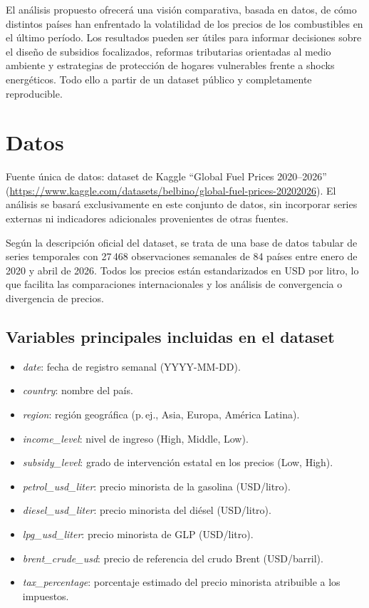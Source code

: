 \documentclass[stu, 12pt, a4paper, biblatex, donotrepeattitle]{apa7}
\begin{document}
El análisis propuesto ofrecerá una visión comparativa, basada en datos, de cómo distintos países han enfrentado la volatilidad de los precios de los combustibles en el último período. Los resultados pueden ser útiles para informar decisiones sobre el diseño de subsidios focalizados, reformas tributarias orientadas al medio ambiente y estrategias de protección de hogares vulnerables frente a shocks energéticos. Todo ello a partir de un dataset público y completamente reproducible.

\section{Datos}

Fuente única de datos: dataset de Kaggle ``Global Fuel Prices 2020--2026'' (\url{https://www.kaggle.com/datasets/belbino/global-fuel-prices-20202026}). El análisis se basará exclusivamente en este conjunto de datos, sin incorporar series externas ni indicadores adicionales provenientes de otras fuentes.

Según la descripción oficial del dataset, se trata de una base de datos tabular de series temporales con 27\,468 observaciones semanales de 84 países entre enero de 2020 y abril de 2026. Todos los precios están estandarizados en USD por litro, lo que facilita las comparaciones internacionales y los análisis de convergencia o divergencia de precios.

\subsection{Variables principales incluidas en el dataset}

\begin{itemize}
  \item \textit{date}: fecha de registro semanal (YYYY-MM-DD).
  \item \textit{country}: nombre del país.
  \item \textit{region}: región geográfica (p.\,ej., Asia, Europa, América Latina).
  \item \textit{income\_level}: nivel de ingreso (High, Middle, Low).
  \item \textit{subsidy\_level}: grado de intervención estatal en los precios (Low, High).
  \item \textit{petrol\_usd\_liter}: precio minorista de la gasolina (USD/litro).
  \item \textit{diesel\_usd\_liter}: precio minorista del diésel (USD/litro).
  \item \textit{lpg\_usd\_liter}: precio minorista de GLP (USD/litro).
  \item \textit{brent\_crude\_usd}: precio de referencia del crudo Brent (USD/barril).
  \item \textit{tax\_percentage}: porcentaje estimado del precio minorista atribuible a los impuestos.
\end{itemize}
\end{document}
